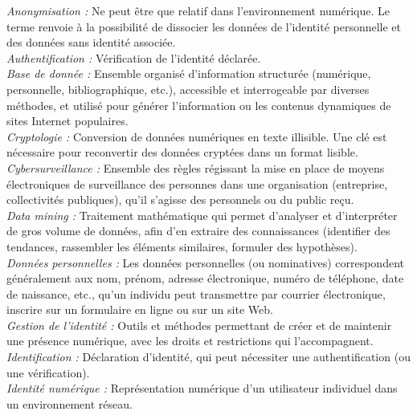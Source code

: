 \documentclass[a4paper,12pt]{article}
\begin{document}
\emph{Anonymisation :} Ne peut être que relatif dans l’environnement numérique. Le terme renvoie à la possibilité de dissocier les données de l’identité personnelle et des données sans identité associée. \\


\emph{Authentification :} Vérification de l’identité déclarée.\\


\emph{Base de donnée :} Ensemble organisé d’information structurée (numérique, personnelle, bibliographique, etc.), accessible et interrogeable par diverses méthodes, et utilisé pour générer l’information ou les contenus dynamiques de sites Internet populaires.\\

\emph{Cryptologie :} Conversion de données numériques en texte illisible. Une clé est nécessaire pour reconvertir des données cryptées dans un format lisible.\\


\emph{Cybersurveillance :} Ensemble des règles régissant la mise en place de moyens électroniques de surveillance des personnes dans une organisation (entreprise, collectivités publiques), qu’il s’agisse des personnels ou du public reçu. \\


\emph{Data mining :} Traitement mathématique qui permet d’analyser et d’interpréter de gros volume de données, afin d’en extraire des connaissances (identifier des tendances, rassembler les éléments similaires, formuler des hypothèses). \\


\emph{Données personnelles :} Les données personnelles (ou nominatives) correspondent généralement aux nom, prénom, adresse électronique, numéro de téléphone, date de naissance, etc., qu’un individu peut transmettre par courrier électronique, inscrire sur un formulaire en ligne ou sur un site Web.\\


\emph{Gestion de l’identité :} Outils et méthodes permettant de créer et de maintenir une présence numérique, avec les droits et restrictions qui l’accompagnent. \\


\emph{Identification :} Déclaration d’identité, qui peut nécessiter une authentification (ou une vérification). \\


\emph{Identité numérique :} Représentation numérique d’un utilisateur individuel dans un environnement réseau. \\
\end{document}

